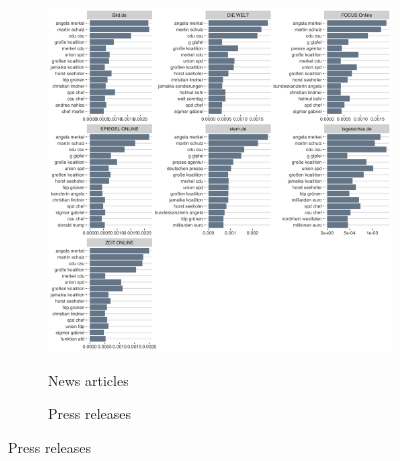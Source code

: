 \documentclass[12pt,a4paper,notitlepage]{article}
\begin{document}

\begin{figure}[H]
	\begin{center}
	\caption{Term frequency}
		\begin{subfigure}[normla]{0.57\textwidth}
			\caption{News articles}
			\includegraphics[width=\textwidth]{../figs/tf_bigrams_news}
			\label{fig_tf_news}
		\end{subfigure}
		\begin{subfigure}[normla]{0.38\textwidth}
			\caption{Press releases}

\end{subfigure}
\end{center}
\end{figure}
\end{document}
